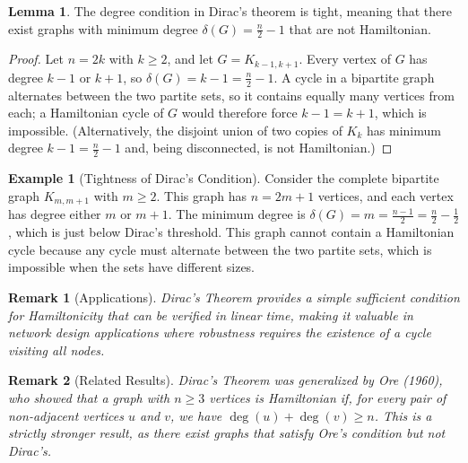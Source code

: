 \documentclass{article}
\newtheorem{remark}{Remark}
\theoremstyle{definition}
\newtheorem{example}{Example}
\newtheorem{lemma}{Lemma}
\begin{document}
\begin{lemma}
The degree condition in Dirac's theorem is tight, meaning that there exist graphs with minimum degree $\delta(G) = \frac{n}{2} - 1$ that are not Hamiltonian.
\end{lemma}
\begin{proof}
Let $n = 2k$ with $k \geq 2$, and let $G = K_{k-1,k+1}$. Every vertex of $G$ has degree $k-1$ or $k+1$, so $\delta(G) = k-1 = \frac{n}{2} - 1$. A cycle in a bipartite graph alternates between the two partite sets, so it contains equally many vertices from each; a Hamiltonian cycle of $G$ would therefore force $k-1 = k+1$, which is impossible. (Alternatively, the disjoint union of two copies of $K_k$ has minimum degree $k-1 = \frac{n}{2}-1$ and, being disconnected, is not Hamiltonian.)
\end{proof}
\begin{example}[Tightness of Dirac's Condition]
Consider the complete bipartite graph $K_{m,m+1}$ with $m \geq 2$. This graph has $n = 2m+1$ vertices, and each vertex has degree either $m$ or $m+1$. The minimum degree is $\delta(G) = m = \frac{n-1}{2} = \frac{n}{2} - \frac{1}{2}$, which is just below Dirac's threshold. This graph cannot contain a Hamiltonian cycle because any cycle must alternate between the two partite sets, which is impossible when the sets have different sizes.
\end{example}
\begin{remark}[Applications]
Dirac's Theorem provides a simple sufficient condition for Hamiltonicity that can be verified in linear time, making it valuable in network design applications where robustness requires the existence of a cycle visiting all nodes.
\end{remark}
\begin{remark}[Related Results]
Dirac's Theorem was generalized by Ore (1960), who showed that a graph with $n \geq 3$ vertices is Hamiltonian if, for every pair of non-adjacent vertices $u$ and $v$, we have $\deg(u) + \deg(v) \geq n$. This is a strictly stronger result, as there exist graphs that satisfy Ore's condition but not Dirac's.
\end{remark}
\end{document}
